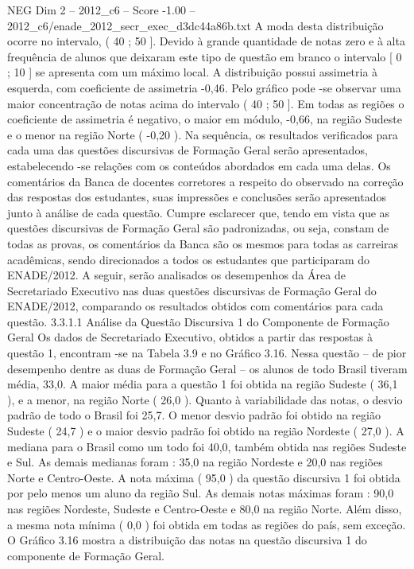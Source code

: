 \begin{textsample}{NEG Dim 2 – 2012\_c6 – Score -1.00 – 2012\_c6/enade\_2012\_secr\_exec\_d3dc44a86b.txt}
A moda desta distribuição ocorre no intervalo, ( 40 ; 50 ].
Devido à grande quantidade de notas zero e à alta frequência de alunos que deixaram este tipo de questão em branco o intervalo [ 0 ; 10 ] se apresenta com um máximo local.
A distribuição possui assimetria à esquerda, com coeficiente de assimetria -0,46.
Pelo gráfico pode -se observar uma maior concentração de notas acima do intervalo ( 40 ; 50 ].
Em todas as regiões o coeficiente de assimetria é negativo, o maior em módulo, -0,66, na região Sudeste e o menor na região Norte ( -0,20 ).
Na sequência, os resultados verificados para cada uma das questões discursivas de Formação Geral serão apresentados, estabelecendo -se relações com os conteúdos abordados em cada uma delas.
Os comentários da Banca de docentes corretores a respeito do observado na correção das respostas dos estudantes, suas impressões e conclusões serão apresentados junto à análise de cada questão.
Cumpre esclarecer que, tendo em vista que as questões discursivas de Formação Geral são padronizadas, ou seja, constam de todas as provas, os comentários da Banca são os mesmos para todas as carreiras acadêmicas, sendo direcionados a todos os estudantes que participaram do ENADE/2012.
A seguir, serão analisados os desempenhos da Área de Secretariado Executivo nas duas questões discursivas de Formação Geral do ENADE/2012, comparando os resultados obtidos com comentários para cada questão. 3.3.1.1 Análise da Questão Discursiva 1 do Componente de Formação Geral Os dados de Secretariado Executivo, obtidos a partir das respostas à questão 1, encontram -se na Tabela 3.9 e no Gráfico 3.16.
Nessa questão – de pior desempenho dentre as duas de Formação Geral – os alunos de todo Brasil tiveram média, 33,0.
A maior média para a questão 1 foi obtida na região Sudeste ( 36,1 ), e a menor, na região Norte ( 26,0 ).
Quanto à variabilidade das notas, o desvio padrão de todo o Brasil foi 25,7.
O menor desvio padrão foi obtido na região Sudeste ( 24,7 ) e o maior desvio padrão foi obtido na região Nordeste ( 27,0 ).
A mediana para o Brasil como um todo foi 40,0, também obtida nas regiões Sudeste e Sul.
As demais medianas foram : 35,0 na região Nordeste e 20,0 nas regiões Norte e Centro-Oeste.
A nota máxima ( 95,0 ) da questão discursiva 1 foi obtida por pelo menos um aluno da região Sul.
As demais notas máximas foram : 90,0 nas regiões Nordeste, Sudeste e Centro-Oeste e 80,0 na região Norte.
Além disso, a mesma nota mínima ( 0,0 ) foi obtida em todas as regiões do país, sem exceção.
O Gráfico 3.16 mostra a distribuição das notas na questão discursiva 1 do componente de Formação Geral.

\end{textsample}
